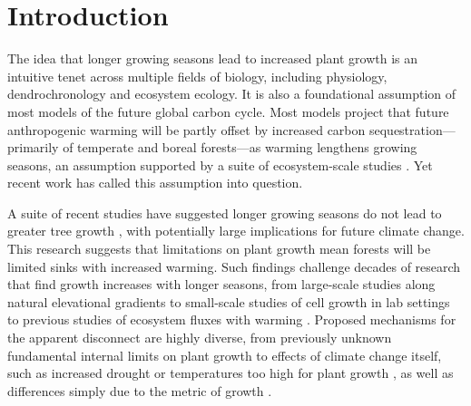 \documentclass[11pt]{article}
\begin{document}

\section*{Introduction} %

The idea that longer growing seasons lead to increased plant growth is an intuitive tenet across multiple fields of biology, including physiology, dendrochronology and ecosystem ecology. It is also a foundational assumption of most models of the future global carbon cycle. Most models project that future anthropogenic warming will be partly offset by increased carbon sequestration---primarily of temperate and boreal forests---as warming lengthens growing seasons, an assumption supported by a suite of ecosystem-scale studies \citep{chen1999effects,keenan2014net,finzi2020}. Yet recent work has called this assumption into question.

A suite of recent studies have suggested longer growing seasons do not lead to greater tree growth \citep{dow2022warm,green2022limits,silvestro2023longer}, with potentially large implications for future climate change. This research suggests that limitations on plant growth mean forests will be limited sinks with increased warming. Such findings challenge decades of research that find growth increases with longer seasons, from large-scale studies along natural elevational gradients to small-scale studies of cell growth in lab settings to previous studies of ecosystem fluxes with warming \citep{chen1999effects,keenan2014net,finzi2020}. Proposed mechanisms for the apparent disconnect are highly diverse, from previously unknown fundamental internal limits on plant growth \citep{zohner2023effect} to effects of climate change itself, such as increased drought or temperatures too high for plant growth \citep{dow2022warm}, as well as differences simply due to the metric of growth \citep{green2022limits}.
\end{document}
